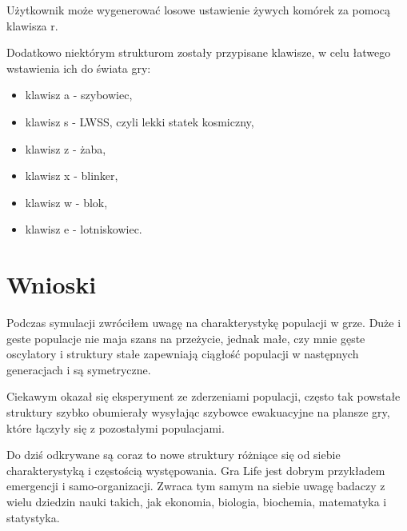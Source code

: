 \documentclass[a4paper, 10pt]{article}
\begin{document}
Użytkownik może wygenerować losowe ustawienie żywych komórek za pomocą klawisza r. 

Dodatkowo niektórym strukturom zostały przypisane klawisze, w celu łatwego wstawienia ich do świata gry:

 \begin{itemize}
  \item klawisz a - szybowiec,
  \item klawisz s - LWSS, czyli lekki statek kosmiczny,
  \item klawisz z - żaba,
  \item klawisz x - blinker,
   \item klawisz w - blok,
  \item klawisz e - lotniskowiec.
\end{itemize}



\section{Wnioski}




Podczas symulacji zwróciłem uwagę na charakterystykę populacji w grze. Duże i geste populacje nie maja szans na przeżycie, 
jednak małe, czy mnie gęste oscylatory i struktury stałe zapewniają ciągłość populacji w następnych generacjach i są symetryczne. 

Ciekawym okazał się eksperyment ze zderzeniami populacji, często tak powstałe struktury szybko obumierały wysyłając 
szybowce ewakuacyjne na plansze gry, które łączyły się z pozostałymi populacjami. 

Do dziś odkrywane są coraz to nowe struktury różniące się od siebie charakterystyką i częstością występowania. 
Gra Life jest dobrym przykładem emergencji i samo-organizacji. Zwraca tym samym na siebie uwagę
badaczy z wielu dziedzin nauki takich, jak ekonomia, biologia, biochemia, matematyka i statystyka.











\nocite{*}

\end{document}
